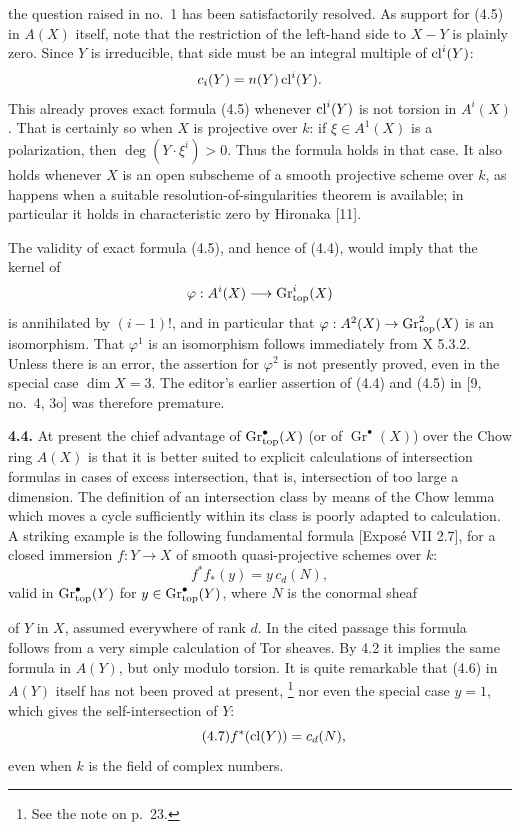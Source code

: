 the question raised in no.~1 has been satisfactorily resolved. As support
for (4.5) in $A(X)$ itself, note that the restriction of the left-hand side
to $X-Y$ is plainly zero. Since $Y$ is irreducible, that side must be an
integral multiple of $\operatorname{cl}^i(Y)$:
\[
 c_i(Y)=n(Y)\operatorname{cl}^i(Y).
\]
This already proves exact formula (4.5) whenever $\operatorname{cl}^i(Y)$ is not torsion
in $A^i(X)$. That is certainly so when $X$ is projective over $k$: if
$\xi\in A^1(X)$ is a polarization, then $\deg(Y\cdot\xi^i)>0$. Thus the
formula holds in that case. It also holds whenever $X$ is an open subscheme
of a smooth projective scheme over $k$, as happens when a suitable
resolution-of-singularities theorem is available; in particular it holds
in characteristic zero by Hironaka [11].

The validity of exact formula (4.5), and hence of (4.4), would imply that
the kernel of
\[
 \varphi:A^i(X)\longrightarrow\operatorname{Gr}_{\mathrm{top}}^i(X)
\]
is annihilated by $(i-1)!$, and in particular that
$\varphi:A^2(X)\to\operatorname{Gr}_{\mathrm{top}}^2(X)$ is an isomorphism. That $\varphi^1$ is an
isomorphism follows immediately from X 5.3.2. Unless there is an error,
the assertion for $\varphi^2$ is not presently proved, even in the special
case $\dim X=3$. The editor's earlier assertion of (4.4) and (4.5) in
[9, no.~4, 3o] was therefore premature.

\textbf{4.4.} At present the chief advantage of $\operatorname{Gr}_{\mathrm{top}}^\bullet(X)$ (or of
$\operatorname{Gr}^\bullet(X)$) over the Chow ring $A(X)$ is that it is
better suited to explicit calculations of intersection formulas in cases
of excess intersection, that is, intersection of too large a dimension.
The definition of an intersection class by means of the Chow lemma which
moves a cycle sufficiently within its class is poorly adapted to
calculation. A striking example is the following fundamental formula
[Exposé VII 2.7], for a closed immersion $f:Y\to X$ of smooth
quasi-projective schemes over $k$:
\begin{equation}\tag{4.6}
 f^*f_*(y)=y\,c_d(N),
\end{equation}
valid in $\operatorname{Gr}_{\mathrm{top}}^\bullet(Y)$ for $y\in\operatorname{Gr}_{\mathrm{top}}^\bullet(Y)$, where $N$ is the
conormal sheaf

of $Y$ in $X$, assumed everywhere of rank $d$. In the cited passage this
formula follows from a very simple calculation of Tor sheaves. By 4.2 it
implies the same formula in $A(Y)$, but only modulo torsion. It is quite
remarkable that (4.6) in $A(Y)$ itself has not been proved at present,
\footnote{See the note on p.~23.} nor even the special case $y=1$, which
gives the self-intersection of $Y$:
\begin{equation}\tag{4.7}
 f^*(\operatorname{cl}(Y))=c_d(N),
\end{equation}
even when $k$ is the field of complex numbers.

